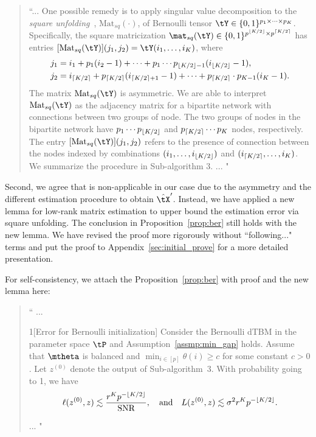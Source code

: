 \documentclass[11pt]{article}
\theoremstyle{definition}
\theoremstyle{definition}
\newcommand{\Mat}{\text{Mat}}
\DeclarePairedDelimiter{\ceil}{\lceil}{\rceil}
\DeclarePairedDelimiter{\floor}{\lfloor}{\rfloor}
\begin{document}
\begin{enumerate}
\begin{enumerate}[wide]
        \begin{quote}
            ``...
            One possible remedy is to apply singular value decomposition to the \emph{square unfolding}~\citep{mu2014square}, $\Mat_{sq}(\cdot)$, of Bernoulli tensor $\tY \in \{0,1\}^{p_1 \times \cdots \times p_K}$. Specifically, the square matricization $\mat_{sq} (\tY) \in \{0,1\}^{p^{\floor{K/2}} \times p^{\ceil{K/2}} }$ has entries $[\Mat_{sq}(\tY)](j_1, j_2) = \tY(i_1, \ldots, i_K)$, where
\begin{align}
    j_1 &= i_1 + p_1(i_2 - 1) + \cdots + p_1 \cdots p_{\floor{K/2}-1} (i_{\floor{K/2}} - 1),\\
    j_2 &= i_{\ceil{K/2}} + p_{ \ceil{K/2}}(i_{\ceil{K/2} + 1} - 1) + \cdots + p_{ \ceil{K/2}} \cdot p_{K-1} (i_K-1).
\end{align}
The matrix $\Mat_{sq}(\tY)$ is asymmetric. We are able to interpret $\Mat_{sq}(\tY)$ as the adjacency matrix for a bipartite network with connections between two groups of node. The two groups of nodes in the bipartite network have $p_1 \cdots p_{\floor{K/2}}$ and $ p_{\ceil{K/2}} \cdots p_K$ nodes, respectively. The entry $[\Mat_{sq}(\tY)](j_1, j_2)$ refers to the presence of connection between the nodes indexed by combinations $(i_1, \ldots, i_{\floor{K/2}})$ and $(i_{\ceil{K/2}}, \ldots, i_K)$. We summarize the procedure in Sub-algorithm 3.
 ... "
        \end{quote}
        
        
        Second, we agree that \citet[Lemma 7]{gao2018community} is non-applicable in our case due to the asymmetry and the different estimation procedure to obtain $\hat \tX'$. Instead, we have applied a new lemma for low-rank matrix estimation to upper bound the estimation error via square unfolding. The conclusion in Proposition~\ref{prop:ber} still holds with the new lemma. We have revised the proof more rigorously without ``following..." terms and put the proof to Appendix~\ref{sec:initial_prove} for a more detailed presentation. 
        
        For self-consistency, we attach the Proposition~\ref{prop:ber} with proof and the new lemma here:
        \begin{quote}
            `` ...
            \begin{customprop}{1}[Error for Bernoulli initialization] Consider the Bernoulli dTBM in the parameter space $\tP$ and Assumption~\ref{assmp:min_gap} holds. Assume that $\mtheta$ is balanced and $\min_{i\in[p]}\theta(i) \geq c$ for some constant $c>0$. Let $ z^{(0)}$ denote the output of Sub-algorithm~3. With probability going to 1, we have
\begin{equation}\label{eq:ini_b}
 \ell(z^{(0)}, z) \lesssim \frac{r^K p^{- \floor{K/2} }}{\text{SNR}}, \quad \text{and} \quad L(z^{(0)}, z) \lesssim  {\sigma^2 r^K p^{-\floor{K/2}}}.
\end{equation}
            \end{customprop}
... "
        \end{quote}
        

\end{enumerate}
\end{enumerate}
\end{document}
